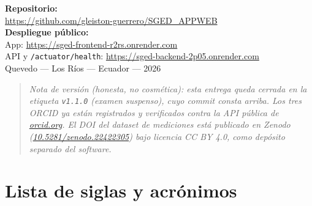\documentclass[11pt,a4paper]{article}
\begin{document}
\begin{titlepage}
{\large\bfseries Repositorio:}\\[0.2cm]
{\ttfamily\url{https://github.com/gleiston-guerrero/SGED_APPWEB}}\\[0.6cm]

{\large\bfseries Despliegue público:}\\[0.2cm]
{\ttfamily\small App: \url{https://sged-frontend-r2rs.onrender.com}}\\[0.1cm]
{\ttfamily\small API y \texttt{/actuator/health}: \url{https://sged-backend-2p05.onrender.com}}\\[1.2cm]

{\large Quevedo --- Los Ríos --- Ecuador --- 2026}

\vfill
\end{titlepage}

\begin{quote}
\small\itshape\color{alerta}
Nota de versión (honesta, no cosmética): esta entrega queda cerrada en la
etiqueta \texttt{v1.1.0} (examen suspenso), cuyo \emph{commit} consta
arriba. Los tres
ORCID ya están registrados y verificados contra la API pública de
\url{orcid.org}. El DOI del \emph{dataset} de mediciones está publicado
en Zenodo (\href{https://doi.org/10.5281/zenodo.22422305}{10.5281/zenodo.22422305})
bajo licencia CC BY 4.0, como depósito separado del software.
\end{quote}

\tableofcontents
\listoffigures
\listoftables
\lstlistoflistings
\newpage

\section*{Lista de siglas y acrónimos}
\end{document}
